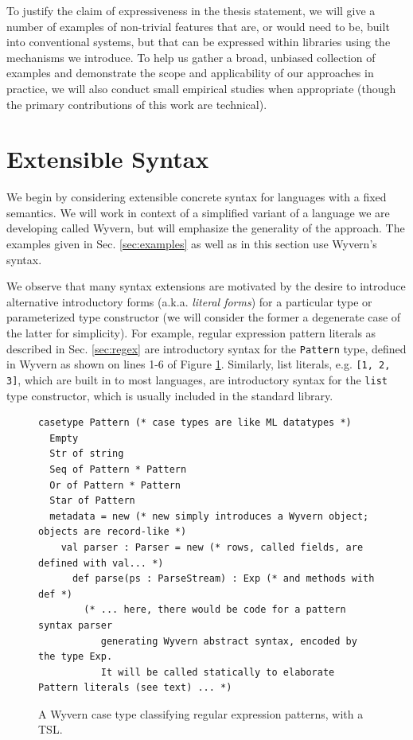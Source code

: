 To justify the claim of expressiveness in the thesis statement, we will give a number of examples of non-trivial features that are, or would need to be, built into conventional systems, but that can be expressed within libraries using the mechanisms we introduce. To help us gather a broad, unbiased collection of examples and demonstrate the scope and applicability of our approaches in practice, we will also conduct small empirical studies when appropriate (though the primary contributions of this work are technical).

\newpage

\section{Extensible Syntax}\label{sec:syntax}

We begin by considering extensible {concrete syntax} for languages with a fixed semantics. We will work in context of a simplified variant of a language we are developing called Wyvern, but will emphasize the generality of the approach. The examples given in Sec. \ref{sec:examples} as well as in this section use Wyvern's syntax.

We observe that many syntax extensions are motivated by the desire to introduce alternative  introductory forms (a.k.a. \emph{literal forms}) for a particular type or parameterized type constructor (we will consider the former a degenerate case of the latter for simplicity). For example, regular expression pattern literals as described in Sec. \ref{sec:regex} are introductory syntax for the \verb|Pattern| type, defined  in Wyvern as shown on lines 1-6 of Figure \ref{fig:pattern}. Similarly, list literals, e.g. \verb|[1, 2, 3]|, which are built in to most languages,  are introductory syntax for the \verb|list| type constructor, which is usually included in the standard library.

\begin{figure}
\begin{lstlisting}[escapechar=$]
casetype Pattern (* case types are like ML datatypes *)
  Empty
  Str of string
  Seq of Pattern * Pattern
  Or of Pattern * Pattern
  Star of Pattern
  metadata = new (* new simply introduces a Wyvern object; objects are record-like *)
    val parser : Parser = new (* rows, called fields, are defined with val... *)
      def parse(ps : ParseStream) : Exp (* and methods with def *)
        (* ... here, there would be code for a pattern syntax parser
           generating Wyvern abstract syntax, encoded by the type Exp. 
           It will be called statically to elaborate Pattern literals (see text) ... *)
\end{lstlisting}
\vspace{-8px}
\caption{A Wyvern case type classifying regular expression patterns, with a TSL.}
\label{fig:pattern}
\end{figure}

